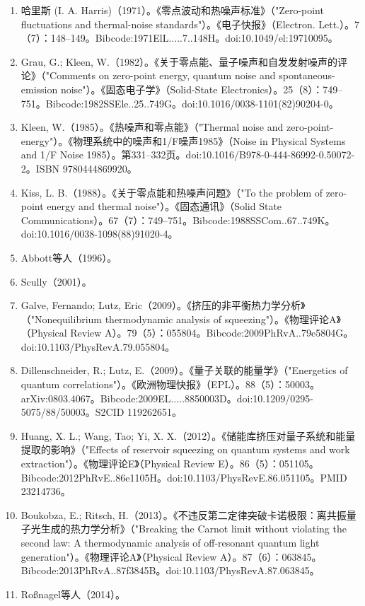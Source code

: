 \begin{enumerate}
\item 哈里斯 (I. A. Harris)（1971）。《零点波动和热噪声标准》（"Zero-point fluctuations and thermal-noise standards"）。《电子快报》（Electron. Lett.）。7（7）：148–149。Bibcode:1971ElL.....7..148H。doi:10.1049/el:19710095。
\item Grau, G.; Kleen, W.（1982）。《关于零点能、量子噪声和自发发射噪声的评论》（"Comments on zero-point energy, quantum noise and spontaneous-emission noise"）。《固态电子学》（Solid-State Electronics）。25（8）：749–751。Bibcode:1982SSEle..25..749G。doi:10.1016/0038-1101(82)90204-0。
\item Kleen, W.（1985）。《热噪声和零点能》（"Thermal noise and zero-point-energy"）。《物理系统中的噪声和1/F噪声1985》（Noise in Physical Systems and 1/F Noise 1985）。第331–332页。doi:10.1016/B978-0-444-86992-0.50072-2。ISBN 9780444869920。
\item Kiss, L. B.（1988）。《关于零点能和热噪声问题》（"To the problem of zero-point energy and thermal noise"）。《固态通讯》（Solid State Communications）。67（7）：749–751。Bibcode:1988SSCom..67..749K。doi:10.1016/0038-1098(88)91020-4。
\item Abbott等人（1996）。
\item Scully（2001）。
\item Galve, Fernando; Lutz, Eric（2009）。《挤压的非平衡热力学分析》（"Nonequilibrium thermodynamic analysis of squeezing"）。《物理评论A》（Physical Review A）。79（5）：055804。Bibcode:2009PhRvA..79e5804G。doi:10.1103/PhysRevA.79.055804。
\item Dillenschneider, R.; Lutz, E.（2009）。《量子关联的能量学》（"Energetics of quantum correlations"）。《欧洲物理快报》（EPL）。88（5）：50003。arXiv:0803.4067。Bibcode:2009EL.....8850003D。doi:10.1209/0295-5075/88/50003。S2CID 119262651。
\item Huang, X. L.; Wang, Tao; Yi, X. X.（2012）。《储能库挤压对量子系统和能量提取的影响》（"Effects of reservoir squeezing on quantum systems and work extraction"）。《物理评论E》（Physical Review E）。86（5）：051105。Bibcode:2012PhRvE..86e1105H。doi:10.1103/PhysRevE.86.051105。PMID 23214736。
\item Boukobza, E.; Ritsch, H.（2013）。《不违反第二定律突破卡诺极限：离共振量子光生成的热力学分析》（"Breaking the Carnot limit without violating the second law: A thermodynamic analysis of off-resonant quantum light generation"）。《物理评论A》（Physical Review A）。87（6）：063845。Bibcode:2013PhRvA..87f3845B。doi:10.1103/PhysRevA.87.063845。
\item Roßnagel等人（2014）。

\end{enumerate}
